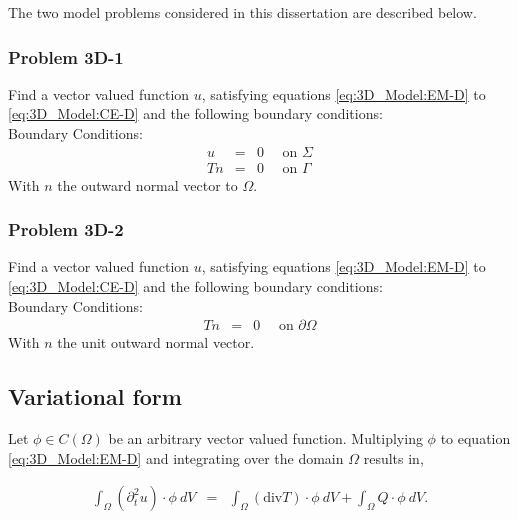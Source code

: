 \documentclass[../../main.tex]{subfiles}
\begin{document}
The two model problems considered in this dissertation are described below.

\subsubsection{Problem 3D-1}\label{sssec:3D_Model:Problem3D1}
Find a vector valued function $u$, satisfying equations
\eqref{eq:3D_Model:EM-D} to \eqref{eq:3D_Model:CE-D} and the following boundary
conditions:\\

Boundary Conditions:
\begin{eqnarray*}
	u & = & 0 \quad \textrm{ on } \Sigma\\
	Tn & = & 0 \quad \textrm{ on } \Gamma
\end{eqnarray*} With $n$ the outward normal vector to $\Omega$.

\subsubsection{Problem 3D-2}\label{sssec:3D_Model:Problem3D2}
Find a vector valued function $u$, satisfying equations
\eqref{eq:3D_Model:EM-D} to \eqref{eq:3D_Model:CE-D} and the following boundary
conditions:\\

Boundary Conditions:
\begin{eqnarray*}
	Tn & = & 0 \quad \textrm{ on } \partial\Omega
\end{eqnarray*} With $n$ the unit outward normal vector.

\subsection{Variational form}\label{ssec:3D_Model:VariationalForm}
Let $\phi \in C({\Omega})$ be an arbitrary vector valued function. Multiplying
$\phi$ to equation \eqref{eq:3D_Model:EM-D} and integrating over the domain
$\Omega$ results in,

\begin{eqnarray*}
	\int_{\Omega} (\partial_t^2 u)\cdot \phi \ dV & = & \int_{\Omega} (\textrm{div} T)\cdot \phi \ dV
	+ \int_{\Omega} Q \cdot \phi \ dV.
\end{eqnarray*}
\end{document}
